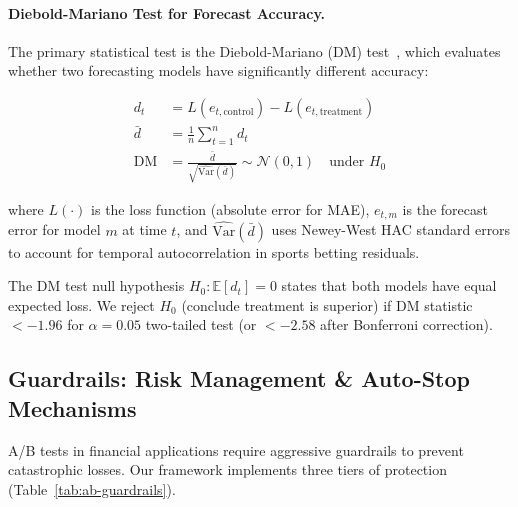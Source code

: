 \paragraph{Diebold-Mariano Test for Forecast Accuracy.}
The primary statistical test is the Diebold-Mariano (DM) test~\citep{diebold1995comparing}, which evaluates whether two forecasting models have significantly different accuracy:

\begin{equation}
\begin{aligned}
d_t &= L(e_{t,\text{control}}) - L(e_{t,\text{treatment}}) \\
\bar{d} &= \frac{1}{n} \sum_{t=1}^{n} d_t \\
\text{DM} &= \frac{\bar{d}}{\sqrt{\widehat{\text{Var}}(\bar{d})}} \sim \mathcal{N}(0, 1) \quad \text{under } H_0
\end{aligned}
\label{eq:diebold-mariano}
\end{equation}

where $L(\cdot)$ is the loss function (absolute error for MAE), $e_{t,m}$ is the forecast error for model $m$ at time $t$, and $\widehat{\text{Var}}(\bar{d})$ uses Newey-West HAC standard errors to account for temporal autocorrelation in sports betting residuals.

The DM test null hypothesis $H_0: \mathbb{E}[d_t] = 0$ states that both models have equal expected loss. We reject $H_0$ (conclude treatment is superior) if DM statistic $< -1.96$ for $\alpha = 0.05$ two-tailed test (or $< -2.58$ after Bonferroni correction).

\subsection{Guardrails: Risk Management \& Auto-Stop Mechanisms}
\label{sec:ab-guardrails}

A/B tests in financial applications require aggressive guardrails to prevent catastrophic losses. Our framework implements three tiers of protection (Table~\ref{tab:ab-guardrails}).

